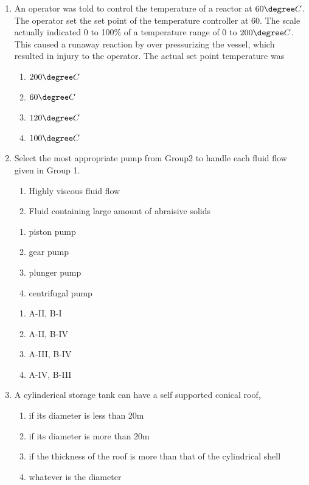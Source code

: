 \documentclass[journal,12pt,onecolumn]{IEEEtran}
\theoremstyle{remark}
\begin{document}
\begin{enumerate}
    \item An operator was told to control the temperature of a reactor at $60\degree C$. The operator set the set point of the temperature controller at 60. The scale actually indicated 0 to 100\% of a temperature range of 0 to $200\degree C$. This caused a runaway reaction by over pressurizing the vessel, which resulted in injury to the operator. The actual set point temperature was

\begin{enumerate}
    \item $200\degree C$
    \item $60\degree C$
    \item $120\degree C$
    \item $100\degree C$
\end{enumerate}
\newpage
    \item Select the most appropriate pump from Group2 to handle each fluid flow given in Group 1.

    \begin{multicols}{2}
        \begin{enumerate}[label =\Alph*]
            \item Highly viscous fluid flow
            \item Fluid containing large amount of abraisive solids
        \end{enumerate}
    \columnbreak
    \begin{enumerate}[label=\Roman*]
        \item piston pump
        \item gear pump
        \item plunger pump
        \item centrifugal pump
    \end{enumerate}
    \end{multicols}

\begin{enumerate}
    \item A-II, B-I
    \item A-II, B-IV
    \item A-III, B-IV
    \item A-IV, B-III
\end{enumerate}

    \item A cylinderical storage tank can have a self supported conical roof,

\begin{enumerate}
    \item if its diameter is less than 20m
    \item if its diameter is more than 20m
    \item if the thickness of the roof is more than that of the cylindrical shell 
    \item whatever is the diameter
\end{enumerate}


\end{enumerate}
\end{document}
